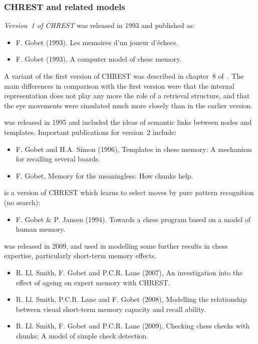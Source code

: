 \documentclass{article}
\begin{document}
\subsubsection{CHREST and related models}

{\em Version~1 of CHREST} was released in 1993 and published as:

\begin{itemize}
\item F. Gobet (1993). Les memoires d'un joueur d'\'echecs.~\cite{Gobet93a}
\item F. Gobet (1993). A computer model of chess memory.~\cite{Gobet93b}
\end{itemize}

A variant of the first version of CHREST was described in chapter~8 of~\cite{deGroot96}.
The main differences in comparison with the first version were that the
internal representation does not play any more the role of a retrieval
structure, and that the eye movements were simulated much more closely than in
the earlier version. 
\vspace{3pt}

 was released in 1995 and included the
ideas of semantic links between nodes and templates.  Important publications
for version~2 include:

\begin{itemize}
\item F. Gobet and H.A. Simon (1996), Templates in chess memory: A mechanism for 
recalling several boards.~\cite{Gobet96b}
\item F. Gobet, Memory for the meaningless: How chunks help.~\cite{Gobet98a}
\end{itemize}

 is a version of CHREST which learns to select moves by pure
pattern recognition (no search):

\begin{itemize}
\item F. Gobet \& P. Jansen (1994). Towards a chess program based on a model of
human memory.~\cite{Gobet94} 
\end{itemize}

 was released in 2009, and used in modelling
some further results in chess expertise, particularly short-term memory
effects.

\begin{itemize}
\item R. Ll. Smith, F. Gobet and P.C.R. Lane (2007), An investigation into the
effect of ageing on expert memory with CHREST.~\cite{Smith07}
\item R. Ll. Smith, P.C.R. Lane and F. Gobet (2008), Modelling the relationship
between visual short-term memory capacity and recall ability.~\cite{Smith08}
\item R. Ll. Smith, F. Gobet and P.C.R. Lane (2009), Checking chess checks with
chunks: A model of simple check detection.~\cite{Smith09}
\end{itemize}
\end{document}
